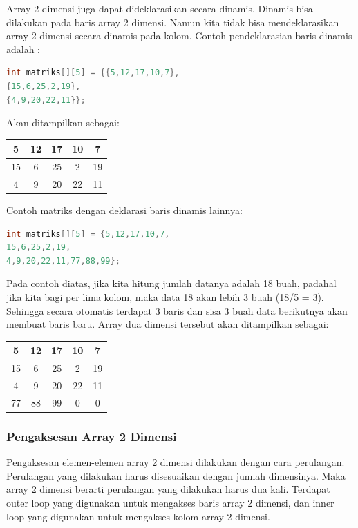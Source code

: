 Array 2 dimensi juga dapat dideklarasikan secara dinamis. Dinamis bisa
dilakukan pada baris array 2 dimensi. Namun kita tidak bisa
mendeklarasikan array 2 dimensi secara dinamis pada kolom. Contoh
pendeklarasian baris dinamis adalah :

\begin{lstlisting}[language=c++, numbers=none]
int matriks[][5] = {{5,12,17,10,7},
{15,6,25,2,19},
{4,9,20,22,11}};
\end{lstlisting}

Akan ditampilkan sebagai:

\begin{tabular}{|c|c|c|c|c|}
\hline
5&12&17&10&7 \\ \hline
15&6&25&2&19 \\ \hline
4&9&20&22&11 \\ \hline
\end{tabular}


Contoh matriks dengan deklarasi baris dinamis lainnya:

\begin{lstlisting}[language=c++, numbers=none]
int matriks[][5] = {5,12,17,10,7,
15,6,25,2,19,
4,9,20,22,11,77,88,99};
\end{lstlisting}

Pada contoh diatas, jika kita hitung jumlah datanya adalah 18 buah,
padahal jika kita bagi per lima kolom, maka data 18 akan lebih 3 buah
(18/5 = 3). Sehingga secara otomatis terdapat 3 baris dan sisa 3 buah
data berikutnya akan membuat baris baru. Array dua dimensi tersebut akan
ditampilkan sebagai:


\begin{tabular}{|c|c|c|c|c|}
\hline
5 & 12 & 17 & 10 & 7 \\ \hline
15 & 6 & 25 & 2 & 19 \\ \hline
4 & 9 & 20 & 22 & 11 \\ \hline
77 & 88 & 99 & 0 & 0 \\ \hline

\end{tabular}

\subsubsection{Pengaksesan Array 2 Dimensi}\label{pengaksesan-array-2-dimensi}

Pengaksesan elemen-elemen array 2 dimensi dilakukan dengan cara
perulangan. Perulangan yang dilakukan harus disesuaikan dengan jumlah
dimensinya. Maka array 2 dimensi berarti perulangan yang dilakukan harus
dua kali. Terdapat outer loop yang digunakan untuk mengakses baris array
2 dimensi, dan inner loop yang digunakan untuk mengakses kolom array 2
dimensi.


